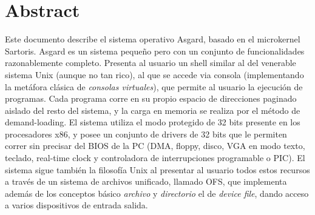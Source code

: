 \documentclass[11pt, letterpaper, twoside]{book}
\begin{document}
\frontmatter
\thispagestyle{empty}

\vspace*{2.5cm}
\noindent{}

\vspace{8cm}
\noindent{}

\newpage
\thispagestyle{empty}
\cleardoublepage

\chapter{Abstract}

Este documento describe el sistema operativo Asgard, basado en el microkernel Sartoris. Asgard es un sistema peque\~no pero con un conjunto de funcionalidades razonablemente completo. Presenta al usuario un shell similar al del venerable sistema Unix (aunque no tan rico), al que se accede via consola (implementando la met\'afora cl\'asica de \emph{consolas virtuales}), que permite al usuario la ejecuci\'on de programas. Cada programa corre en su propio espacio de direcciones paginado aislado del resto del sistema, y la carga en memoria se realiza por el m\'etodo de demand-loading. El sistema utiliza el modo protegido de 32 bits presente en los procesadores x86, y posee un conjunto de drivers de 32 bits que le permiten correr sin precisar del BIOS de la PC (DMA, floppy, disco, VGA en modo texto, teclado, real-time clock y controladora de interrupciones programable o PIC). El sistema sigue tambi\'en la filosof\'ia Unix al presentar al usuario todos estos recursos a trav\'es de un sistema de archivos unificado, llamado OFS, que implementa adem\'as de los conceptos b\'asico \emph{archivo} y \emph{directorio} el de \emph{device file}, dando acceso a varios dispositivos de entrada salida.
\end{document}
